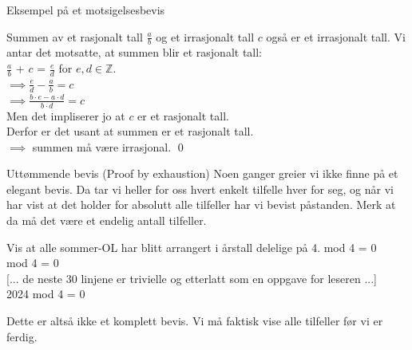 \begin{frame}{Eksempel på et motsigelsesbevis}
    \begin{block}{Summen av et rasjonalt tall $\frac{a}{b}$ og et irrasjonalt tall $c$ også er et irrasjonalt tall.}
        \pause
        Vi antar det motsatte, at summen blir et rasjonalt tall: \\
        \pause
        $\frac{a}{b}$ + $c$ = $\frac{e}{d}$ for $e, d \in \mathbb{Z}$.\\
        \pause
        $\implies \frac{e}{d} - \frac{a}{b} = c$\\
        \pause
        $\implies \frac{b\cdot e - a \cdot d}{b\cdot d} = c$\\[1.5mm]
        \pause
        Men det impliserer jo at $c$ er et rasjonalt tall. \text{\Lightning}\\
        \pause
        Derfor er det usant at summen er et rasjonalt tall.\\
        $\implies$ summen må være irrasjonal.
        \qed
    \end{block}
\end{frame}

\begin{frame}{Uttømmende bevis (Proof by exhaustion)}
    Noen ganger greier vi ikke finne på et elegant bevis. Da tar vi heller for oss hvert enkelt tilfelle hver for seg, og når vi har vist at det holder for absolutt alle tilfeller har vi bevist påstanden. Merk at da må det være et endelig antall tilfeller.
    \pause
    \begin{block}{Vis at alle sommer-OL har blitt arrangert i årstall delelige på 4.}
         mod 4 = 0 \checkmark \\
         mod 4 = 0 \checkmark \\
        \pause
        {[... de neste 30 linjene er trivielle og etterlatt som en oppgave for leseren ...]}\\
        2024 mod 4 = 0 \checkmark
    \end{block}
    \pause
    Dette er altså ikke et komplett bevis. Vi må faktisk vise alle tilfeller før vi er ferdig.
\end{frame}
